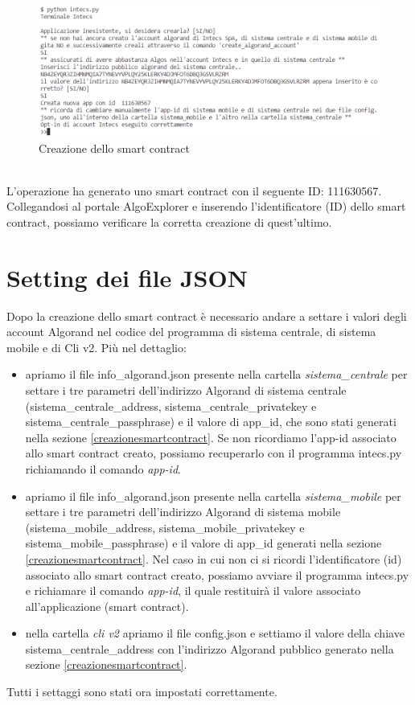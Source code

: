 \begin{figure}[!h]
\centering
\includegraphics[scale=0.8]{images/Intecs/creazione_smartcontract.png}
\caption{Creazione dello smart contract}
\label{fig: intecs_create_smart_contract}
\end{figure}\\
L'operazione ha generato uno smart contract con il seguente ID: 111630567. Collegandosi al portale AlgoExplorer \cite{algoexplorer_testnet} e inserendo l'identificatore (ID) dello smart contract, possiamo verificare la corretta creazione di quest'ultimo.

\section{Setting dei file JSON}
Dopo la creazione dello smart contract è necessario andare a settare i valori degli account Algorand nel codice del programma di sistema centrale, di sistema mobile e di Cli v2. Più nel dettaglio:
\begin{itemize}
    \item apriamo il file info\_algorand.json presente nella cartella \textit{sistema\_centrale} per settare i tre parametri dell'indirizzo Algorand di sistema centrale (sistema\_centrale\_address, sistema\_centrale\_privatekey e sistema\_centrale\_passphrase) e il valore di app\_id, che sono stati generati nella sezione \ref{creazionesmartcontract}. Se non ricordiamo l'app-id associato allo smart contract creato, possiamo recuperarlo con il programma intecs.py richiamando il comando \textit{app-id}.
    \item apriamo il file info\_algorand.json presente nella cartella \textit{sistema\_mobile} per settare i tre parametri dell'indirizzo Algorand di sistema mobile (sistema\_mobile\_address, sistema\_mobile\_privatekey e sistema\_mobile\_passphrase) e il valore di app\_id  generati nella sezione \ref{creazionesmartcontract}. Nel caso in cui non ci si ricordi l'identificatore (id) associato allo smart contract creato, possiamo avviare il programma intecs.py e richiamare il comando \textit{app-id}, il quale restituirà il valore associato all'applicazione (smart contract).
    \item nella cartella \textit{cli v2} apriamo il file config.json e settiamo il valore della chiave sistema\_centrale\_address con l'indirizzo Algorand pubblico generato nella sezione \ref{creazionesmartcontract}.
\end{itemize}
Tutti i settaggi sono stati ora impostati correttamente.

